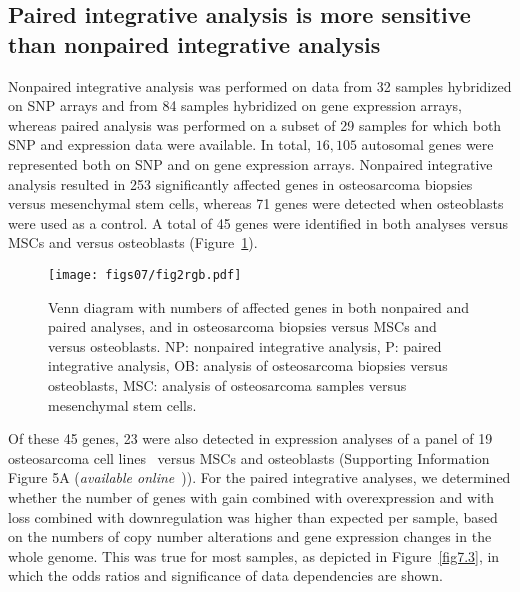 \subsection{Paired integrative analysis is more sensitive than nonpaired integrative analysis}
Nonpaired integrative analysis was performed
on data from 32 samples hybridized on SNP
arrays and from 84 samples hybridized on gene
expression arrays, whereas paired analysis was
performed on a subset of 29 samples for which
both SNP and expression data were available. In
total, $16,105$ autosomal genes were represented
both on SNP and on gene expression arrays.
Nonpaired integrative analysis resulted in 253
significantly affected genes in osteosarcoma biopsies
versus mesenchymal stem cells, whereas 71
genes were detected when osteoblasts were used
as a control. A total of 45 genes were identified
in both analyses versus MSCs and versus osteoblasts
(Figure~\ref{fig7.2}).
%
\begin{figure}[htbp]
  \centering
  \begin{minipage}[b]{0.50\linewidth}
    \texttt{[image: figs07/fig2rgb.pdf]}	%
  \end{minipage}
    \hfill
  \begin{minipage}[b]{0.46\linewidth}
    \caption{Venn diagram with numbers of affected genes in both nonpaired and paired analyses, and in osteosarcoma biopsies versus MSCs and versus osteoblasts. NP: nonpaired integrative analysis, P: paired integrative analysis, OB: analysis of osteosarcoma biopsies versus osteoblasts, MSC: analysis of osteosarcoma samples versus mesenchymal stem cells.}
     \label{fig7.2}
     \end{minipage}
\end{figure}
%
Of these 45 genes, 23 were also
detected in expression analyses of a panel of 19
osteosarcoma cell lines~\cite{ottaviano2010molecular}
versus MSCs and osteoblasts (Supporting Information
Figure 5A ({\it available online}~\cite{ch7additional})). For the paired integrative analyses,
we determined whether the number of genes
with gain combined with overexpression and with
loss combined with downregulation was higher
than expected per sample, based on the numbers
of copy number alterations and gene expression
changes in the whole genome. This was true for
most samples, as depicted in Figure~\ref{fig7.3}, in which the
odds ratios and significance of data dependencies
are shown.
%
